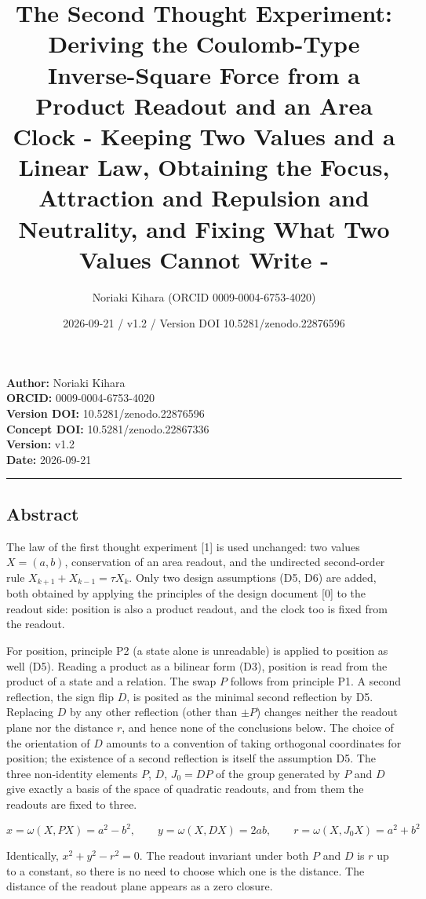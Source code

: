 \documentclass[
  a4paper,
]{article}
\title{The Second Thought Experiment: Deriving the Coulomb-Type
Inverse-Square Force from a Product Readout and an Area Clock - Keeping
Two Values and a Linear Law, Obtaining the Focus, Attraction and
Repulsion and Neutrality, and Fixing What Two Values Cannot Write -}
\author{Noriaki Kihara (ORCID 0009-0004-6753-4020)}
\date{2026-09-21 / v1.2 / Version DOI 10.5281/zenodo.22876596}
\newcounter{none} %
\begin{document}
\maketitle

\textbf{Author:} Noriaki Kihara\\
\textbf{ORCID:} 0009-0004-6753-4020\\
\textbf{Version DOI:} 10.5281/zenodo.22876596\\
\textbf{Concept DOI:} 10.5281/zenodo.22867336\\
\textbf{Version:} v1.2\\
\textbf{Date:} 2026-09-21

\begin{center}\rule{0.5\linewidth}{0.5pt}\end{center}

\subsection{Abstract}\label{abstract}

The law of the first thought experiment {[}1{]} is used unchanged: two
values \(X=(a,b)\), conservation of an area readout, and the undirected
second-order rule \(X_{k+1}+X_{k-1}=\tau X_k\). Only two design
assumptions (D5, D6) are added, both obtained by applying the principles
of the design document {[}0{]} to the readout side: position is also a
product readout, and the clock too is fixed from the readout.

For position, principle P2 (a state alone is unreadable) is applied to
position as well (D5). Reading a product as a bilinear form (D3),
position is read from the product of a state and a relation. The swap
\(P\) follows from principle P1. A second reflection, the sign flip
\(D\), is posited as the minimal second reflection by D5. Replacing
\(D\) by any other reflection (other than \(\pm P\)) changes neither the
readout plane nor the distance \(r\), and hence none of the conclusions
below. The choice of the orientation of \(D\) amounts to a convention of
taking orthogonal coordinates for position; the existence of a second
reflection is itself the assumption D5. The three non-identity elements
\(P\), \(D\), \(J_0=DP\) of the group generated by \(P\) and \(D\) give
exactly a basis of the space of quadratic readouts, and from them the
readouts are fixed to three.

\[
x=\omega(X,PX)=a^2-b^2,\qquad y=\omega(X,DX)=2ab,\qquad r=\omega(X,J_0X)=a^2+b^2
\]

Identically, \(x^2+y^2-r^2=0\). The readout invariant under both \(P\)
and \(D\) is \(r\) up to a constant, so there is no need to choose which
one is the distance. The distance of the readout plane appears as a zero
closure.
\end{document}
